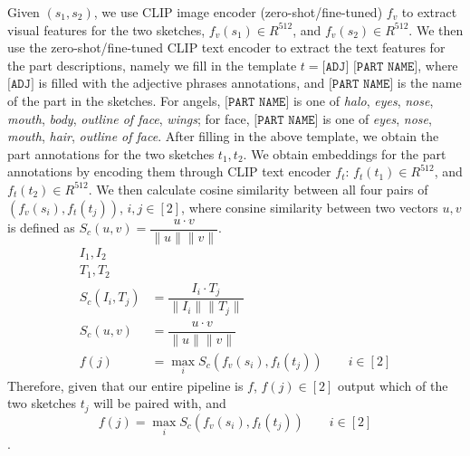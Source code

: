 Given $(s_1,s_2)$, we use CLIP image encoder (zero-shot/fine-tuned) $f_v$ to extract visual features for the two sketches,  $f_v(s_1) \in {R}^{512}$, and $f_v(s_2) \in {R}^{512}$. We then use the zero-shot/fine-tuned CLIP text encoder to extract the text features for the part descriptions, namely we fill in the template $t = \texttt{[ADJ] [PART NAME]}$, where $\texttt{[ADJ]}$ is filled with the adjective phrases annotations, and $\texttt{[PART NAME]}$ is the name of the part in the sketches. For angels, $\texttt{[PART NAME]}$ is one of \textit{halo}, \textit{eyes}, \textit{nose}, \textit{mouth}, \textit{body}, \textit{outline of face}, \textit{wings}; for face, $\texttt{[PART NAME]}$ is one of \textit{eyes}, \textit{nose}, \textit{mouth}, \textit{hair}, \textit{outline of face}. After filling in the above template, we obtain the part annotations for the two sketches $t_1,t_2$.  
We obtain embeddings for the part annotations by encoding them through CLIP text encoder $f_t$: $f_t(t_1) \in {R}^{512}$, and $f_t(t_2) \in {R}^{512}$. We then calculate cosine similarity between all four pairs of $(f_v(s_i), f_t(t_j))$, $i,j \in [2]$, where consine similarity between two vectors $u,v$ is defined as $S_c(u,v) = \dfrac{u \cdot v}{\|u\| \|v\|}$. 
\begin{equation}
    \begin{split}
        I_1, I_2 \\
        T_1, T_2 \\
        S_c(I_i,T_j) & = \dfrac{I_i \cdot T_j}{\|I_i\| \|T_j\|} \\
        S_c(u,v) & = \dfrac{u \cdot v}{\|u\| \|v\|} \\
        f(j) & = \max_{i} S_c(f_v(s_i), f_t(t_j)) \hspace{2em} i \in [2]
    \end{split}
\end{equation}
Therefore, given that our entire pipeline is $f$, $f(j) \in [2]$ output which of the two sketches $t_j$ will be paired with, and $$f(j) = \max_{i} S_c(f_v(s_i), f_t(t_j)) \hspace{2em} i \in [2]$$.    

